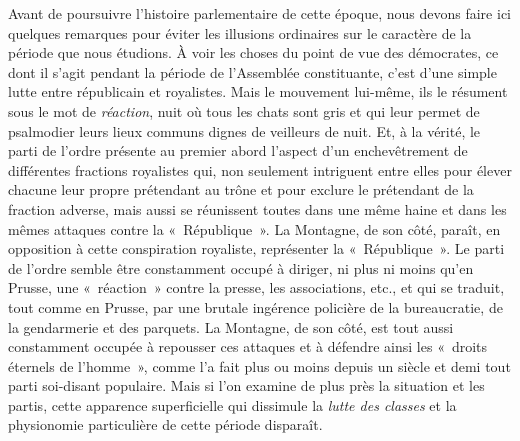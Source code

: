\documentclass[french,twoside]{book} %
\begin{document}
Avant de poursuivre l’histoire parlementaire de cette époque, nous devons faire ici quelques remarques pour éviter les illusions ordinaires sur le caractère de la période que nous étudions. À voir les choses du point de vue des démocrates, ce dont il s’agit pendant la période de l’Assemblée constituante, c’est d’une simple lutte entre républicain et royalistes. Mais le mouvement lui-même, ils le résument sous le mot de \emph{réaction}, nuit où tous les chats sont gris et qui leur permet de psalmodier leurs lieux communs dignes de veilleurs de nuit. Et, à la vérité, le parti de l’ordre présente au premier abord l’aspect d’un enchevêtrement de différentes fractions royalistes qui, non seulement intriguent entre elles pour élever chacune leur propre prétendant au trône et pour exclure le prétendant de la fraction adverse, mais aussi se réunissent toutes dans une même haine et dans les mêmes attaques contre la « République ». La Montagne, de son côté, paraît, en opposition à cette conspiration royaliste, représenter la « République ». Le parti de l’ordre semble être constamment occupé à diriger, ni plus ni moins qu’en Prusse, une « réaction » contre la presse, les associations, etc., et qui se traduit, tout comme en Prusse, par une brutale ingérence policière de la bureaucratie, de la gendarmerie et des parquets. La Montagne, de son côté, est tout aussi constamment occupée à repousser ces attaques et à défendre ainsi les « droits éternels de l’homme », comme l’a fait plus ou moins depuis un siècle et demi tout parti soi-disant populaire. Mais si l’on examine de plus près la situation et les partis, cette apparence superficielle qui dissimule la \emph{lutte des classes} et la physionomie particulière de cette période disparaît.\par
\end{document}
